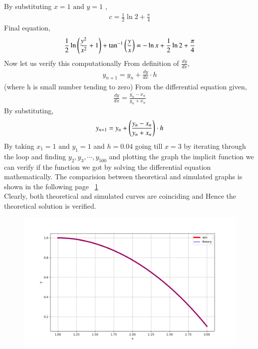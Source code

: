 \documentclass[journal]{IEEEtran}
\begin{document}
By substituting $x=1 \text{ and } y=1$ ,
\begin{align}
    c = \frac{1}{2}\ln{2} + \frac{\pi}{4}
\end{align}
Final equation,
\begin{align}
    \frac{1}{2}\ln \left(\frac{y^2}{x^2}+1\right) + \tan^{-1}{\left(\frac{y}{x}\right)} = - \ln{x} + \frac{1}{2}\ln{2} + \frac{\pi}{4}   
\end{align}
Now let us verify this computationally
From definition of $\frac{dy}{dx}$,
\begin{align}
    y_{n+1}=y_{n}+\frac{dy}{dx}\cdot h    
\end{align}
(where h is small number tending to zero)
From the differential equation given,
\begin{align}
    \frac{dy}{dx}=\frac{y_n-x_n}{y_n+x_n}
\end{align}
By substituting,
\begin{align}
    y_{n+1}=y_{n}+\left(\frac{y_n-x_n}{y_n+x_n}\right)\cdot h
\end{align}
By taking $x_1=1 \text{ and } y_1=1$  and $h=0.04$ going till $x=3$ by iterating through the loop and finding $y_2,y_3,\cdots , y_{500}$ and plotting the graph the implicit function we can verify if the function we got by solving the differential equation mathematically.
The comparision between theoretical and simulated graphs is shown in the following page ~\ref{fig:1}\\
Clearly, both theoretical and simulated curves are coinciding and Hence the theoretical solution is verified.
\begin{figure}[ht]
    \centering
    \includegraphics[width=\columnwidth]{figs/Figure_1.png}
    \caption{}
    \label{fig:1}
\end{figure}
\end{document}
